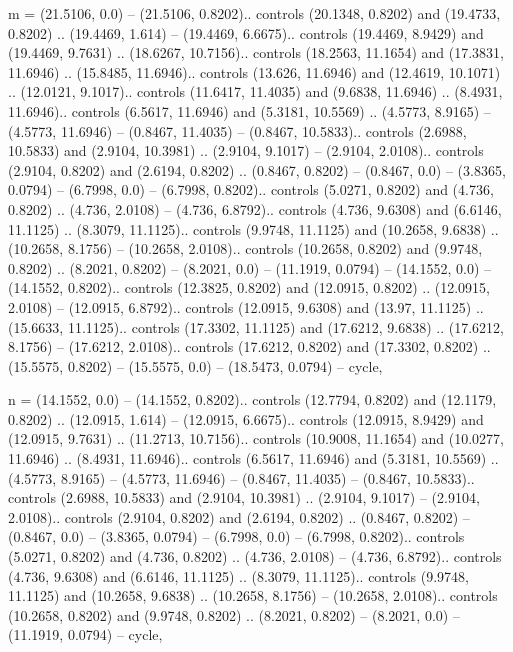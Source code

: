 m = {(21.5106, 0.0) -- (21.5106, 0.8202).. controls (20.1348, 0.8202) and (19.4733, 0.8202) .. (19.4469, 1.614) -- (19.4469, 6.6675).. controls (19.4469, 8.9429) and (19.4469, 9.7631) .. (18.6267, 10.7156).. controls (18.2563, 11.1654) and (17.3831, 11.6946) .. (15.8485, 11.6946).. controls (13.626, 11.6946) and (12.4619, 10.1071) .. (12.0121, 9.1017).. controls (11.6417, 11.4035) and (9.6838, 11.6946) .. (8.4931, 11.6946).. controls (6.5617, 11.6946) and (5.3181, 10.5569) .. (4.5773, 8.9165) -- (4.5773, 11.6946) -- (0.8467, 11.4035) -- (0.8467, 10.5833).. controls (2.6988, 10.5833) and (2.9104, 10.3981) .. (2.9104, 9.1017) -- (2.9104, 2.0108).. controls (2.9104, 0.8202) and (2.6194, 0.8202) .. (0.8467, 0.8202) -- (0.8467, 0.0) -- (3.8365, 0.0794) -- (6.7998, 0.0) -- (6.7998, 0.8202).. controls (5.0271, 0.8202) and (4.736, 0.8202) .. (4.736, 2.0108) -- (4.736, 6.8792).. controls (4.736, 9.6308) and (6.6146, 11.1125) .. (8.3079, 11.1125).. controls (9.9748, 11.1125) and (10.2658, 9.6838) .. (10.2658, 8.1756) -- (10.2658, 2.0108).. controls (10.2658, 0.8202) and (9.9748, 0.8202) .. (8.2021, 0.8202) -- (8.2021, 0.0) -- (11.1919, 0.0794) -- (14.1552, 0.0) -- (14.1552, 0.8202).. controls (12.3825, 0.8202) and (12.0915, 0.8202) .. (12.0915, 2.0108) -- (12.0915, 6.8792).. controls (12.0915, 9.6308) and (13.97, 11.1125) .. (15.6633, 11.1125).. controls (17.3302, 11.1125) and (17.6212, 9.6838) .. (17.6212, 8.1756) -- (17.6212, 2.0108).. controls (17.6212, 0.8202) and (17.3302, 0.8202) .. (15.5575, 0.8202) -- (15.5575, 0.0) -- (18.5473, 0.0794) -- cycle},

n = {(14.1552, 0.0) -- (14.1552, 0.8202).. controls (12.7794, 0.8202) and (12.1179, 0.8202) .. (12.0915, 1.614) -- (12.0915, 6.6675).. controls (12.0915, 8.9429) and (12.0915, 9.7631) .. (11.2713, 10.7156).. controls (10.9008, 11.1654) and (10.0277, 11.6946) .. (8.4931, 11.6946).. controls (6.5617, 11.6946) and (5.3181, 10.5569) .. (4.5773, 8.9165) -- (4.5773, 11.6946) -- (0.8467, 11.4035) -- (0.8467, 10.5833).. controls (2.6988, 10.5833) and (2.9104, 10.3981) .. (2.9104, 9.1017) -- (2.9104, 2.0108).. controls (2.9104, 0.8202) and (2.6194, 0.8202) .. (0.8467, 0.8202) -- (0.8467, 0.0) -- (3.8365, 0.0794) -- (6.7998, 0.0) -- (6.7998, 0.8202).. controls (5.0271, 0.8202) and (4.736, 0.8202) .. (4.736, 2.0108) -- (4.736, 6.8792).. controls (4.736, 9.6308) and (6.6146, 11.1125) .. (8.3079, 11.1125).. controls (9.9748, 11.1125) and (10.2658, 9.6838) .. (10.2658, 8.1756) -- (10.2658, 2.0108).. controls (10.2658, 0.8202) and (9.9748, 0.8202) .. (8.2021, 0.8202) -- (8.2021, 0.0) -- (11.1919, 0.0794) -- cycle},

